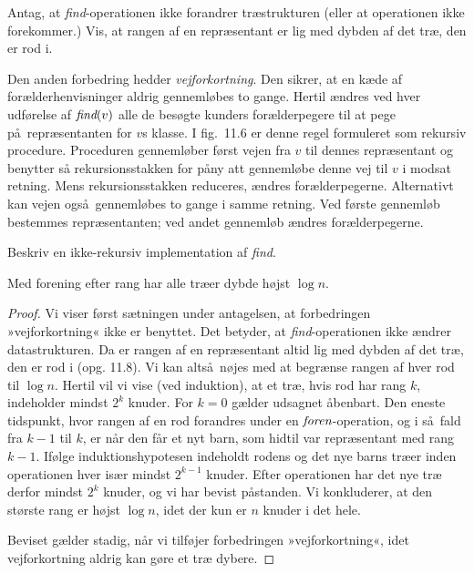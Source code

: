 \begin{exerc}
Antag, at \emph{find}-operationen ikke forandrer træstrukturen (eller at operationen ikke forekommer.)
Vis, at rangen af en repræsentant er lig med dybden af det træ, den er rod i.
\end{exerc}

Den anden forbedring hedder \emph{vejforkortning}.
Den sikrer, at en kæde af forælderhenvisninger aldrig gennemløbes to gange.
Hertil ændres ved hver udførelse af $\operatorname{\emph{find}}(v)$ alle de besøgte kunders forælderpegere til at pege på repræsentanten for $v$s klasse.
I fig.~11.6 er denne regel formuleret som rekursiv procedure.
Proceduren gennemløber først vejen fra $v$ til dennes repræsentant og benytter så rekursionsstakken for påny att gennemløbe denne vej til $v$ i modsat retning.
Mens rekursionsstakken reduceres, ændres forælderpegerne.
Alternativt kan vejen også gennemløbes to gange i samme retning.
Ved første gennemløb bestemmes repræsentanten; ved andet gennemløb ændres forælderpegerne.

\begin{exerc}
  Beskriv en ikke-rekursiv implementation af \emph{find}.
\end{exerc}

\begin{thm}
  Med forening efter rang har alle træer dybde højst $\log n$.
\end{thm}

\begin{proof}
Vi viser først sætningen under antagelsen, at forbedringen »vejforkortning« ikke er benyttet.
Det betyder, at \emph{find}-operationen ikke ændrer datastrukturen.
Da er rangen af en repræsentant altid lig med dybden af det træ, den er rod i (opg. 11.8).
Vi kan altså nøjes med at begrænse rangen af hver rod til $\log n$.
Hertil vil  vi vise (ved induktion), at et træ, hvis rod har rang $k$, indeholder mindst $2^k$ knuder.
For $k=0$ gælder udsagnet åbenbart.
  Den eneste tidspunkt, hvor rangen af en rod forandres under en $\operatorname{\emph{foren}}$-operation, og i så fald fra $k-1$ til $k$, er når den får et nyt barn, som hidtil var repræsentant med rang $k-1$.
Ifølge induktionshypotesen indeholdt rodens og det nye barns træer inden operationen hver især mindst $2^{k-1}$ knuder.
Efter operationen har det nye træ derfor mindst $2^k$ knuder, og vi har bevist påstanden.
Vi konkluderer, at den største rang er højst $\log n$, idet der kun er $n$ knuder i det hele.

Beviset gælder stadig, når vi tilføjer forbedringen »vejforkortning«, idet vejforkortning aldrig kan gøre et træ dybere.
\end{proof}

